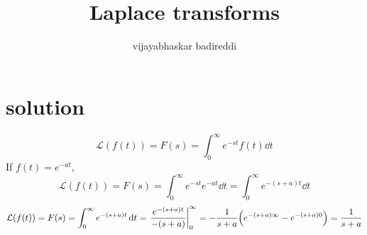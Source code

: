 \documentclass[12pt]{article}
\title{Laplace transforms}
\author{vijayabhaskar badireddi}
\begin{document}

\section*{solution}
\[\mathcal{L}(f(t))=F(s)=\int_{0}^{\infty}e^{-st}f(t)\dd{t}\]
If $f(t)=e^{-at}$,
\[\mathcal{L}(f(t))=F(s)=\int_{0}^{\infty}e^{-st}e^{-at}\dd{t}=\int_{0}^{\infty}e^{-(s+a)t}\dd{t}\]
\[\mathcal{L}(f(t))=F(s)=\int_{0}^{\infty}e^{-(s+a)t}\dd{t}=\eval{\frac{e^{-(s+a)t}}{-(s+a)}}_{0}^{\infty}=-\frac{1}{s+a}\qty(e^{-(s+a)\infty}-e^{-(s+a)0})=\frac{1}{s+a}\]
\end{document}
